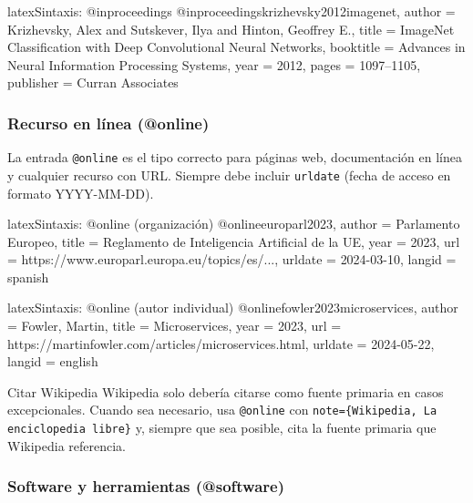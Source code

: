 \begin{codigosimple}{latex}{Sintaxis: @inproceedings}
@inproceedings{krizhevsky2012imagenet,
  author    = {Krizhevsky, Alex and Sutskever, Ilya
               and Hinton, Geoffrey E.},
  title     = {ImageNet Classification with Deep
               Convolutional Neural Networks},
  booktitle = {Advances in Neural Information
               Processing Systems},
  year      = {2012},
  pages     = {1097--1105},
  publisher = {Curran Associates}
}
\end{codigosimple}

\subsubsection{Recurso en línea (@online)}

La entrada \texttt{@online} es el tipo correcto para páginas web, documentación
en línea y cualquier recurso con URL. Siempre debe incluir \texttt{urldate}
(fecha de acceso en formato YYYY-MM-DD).

\begin{codigosimple}{latex}{Sintaxis: @online (organización)}
@online{europarl2023,
  author  = {{Parlamento Europeo}},
  title   = {Reglamento de Inteligencia Artificial de la UE},
  year    = {2023},
  url     = {https://www.europarl.europa.eu/topics/es/...},
  urldate = {2024-03-10},
  langid  = {spanish}
}
\end{codigosimple}

\begin{codigosimple}{latex}{Sintaxis: @online (autor individual)}
@online{fowler2023microservices,
  author  = {Fowler, Martin},
  title   = {Microservices},
  year    = {2023},
  url     = {https://martinfowler.com/articles/microservices.html},
  urldate = {2024-05-22},
  langid  = {english}
}
\end{codigosimple}

\begin{warningbox}{Citar Wikipedia}
Wikipedia solo debería citarse como fuente primaria en casos excepcionales.
Cuando sea necesario, usa \texttt{@online} con \texttt{note=\{Wikipedia,
La enciclopedia libre\}} y, siempre que sea posible, cita la fuente
primaria que Wikipedia referencia.
\end{warningbox}

\subsubsection{Software y herramientas (@software)}

